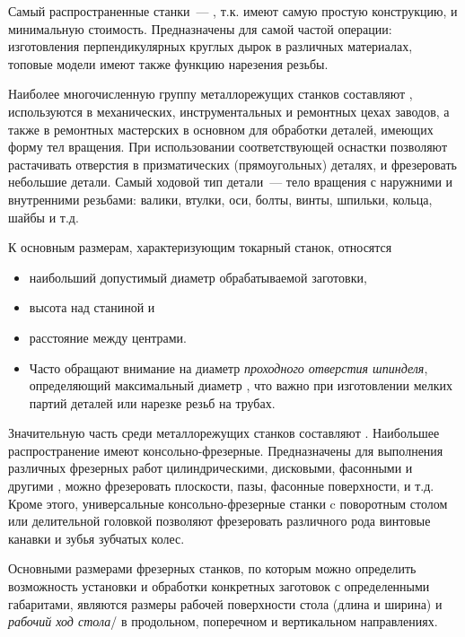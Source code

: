 \secdown

Самый распространенные станки\ --- , т.к. имеют самую простую
конструкцию, и минимальную стоимость. Предназначены для самой частой операции:
изготовления перпендикулярных круглых дырок в различных материалах, топовые
модели имеют также функцию нарезения резьбы.

\bigskip

Наиболее многочисленную группу металлорежущих станков составляют , используются в механических, инструментальных и ремонтных цехах
заводов, а также в ремонтных мастерских в основном для обработки деталей,
имеющих форму тел вращения. При использовании соответствующей оснастки позволяют
растачивать отверстия в призматических (прямоугольных) деталях, и фрезеровать
небольшие детали. Самый ходовой тип детали\ --- тело вращения с наружними и
внутренними резьбами: валики, втулки, оси, болты, винты, шпильки, кольца, шайбы
и т.д.

К основным размерам, характеризующим токарный станок, относятся 
\begin{itemize}
  \item наибольший допустимый диаметр обрабатываемой заготовки, 
  \item высота  над станиной и 
  \item расстояние между центрами.
  \item 
Часто обращают внимание на диаметр \emph{проходного отверстия шпинделя},
определяющий максимальный диаметр , что важно при
изготовлении мелких партий деталей или нарезке резьб на трубах.
\end{itemize}

\bigskip
Значительную часть среди металлорежущих станков составляют . Наибольшее распространение имеют консольно-фрезерные.
Предназначены для выполнения различных фрезерных работ цилиндрическими,
дисковыми, фасонными и другими , можно фрезеровать плоскости,
пазы, фасонные поверхности, и т.д. Кроме этого, универсальные
консольно-фрезерные станки c поворотным столом или делительной головкой
позволяют фрезеровать различного рода винтовые канавки и зубья зубчатых колес.

Основными размерами фрезерных станков, по которым можно определить возможность
установки и обработки конкретных заготовок с определенными габаритами, являются
размеры рабочей поверхности стола (длина и ширина) и \emph{рабочий ход
стола}/ в продольном, поперечном и вертикальном направлениях.

